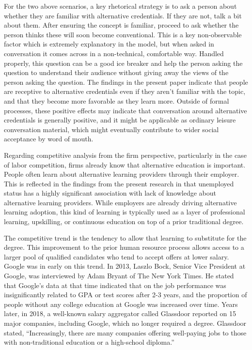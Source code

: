 \documentclass[AER]{/Users/zyl357/Documents/GitHub/research-dissertation-case-for-alt-ed/papers/alt-ed-survey/aea-latex-templates/AEA}
\begin{document}
For the two above scenarios, a key rhetorical strategy is to ask a person
about whether they are familiar with alternative credentials. If they are
not, talk a bit about them. After ensuring the concept is familiar,
proceed to ask whether the person thinks these will soon become
conventional. This is a key non-observable factor which is extremely
explanatory in the model, but when asked in conversation it comes across
in a non-technical, comfortable way. Handled properly, this question can
be a good ice breaker and help the person asking the question to
understand their audience without giving away the views of the person
asking the question. The findings in the present paper indicate that
people are receptive to alternative credentials even if they aren’t
familiar with the topic, and that they become more favorable as they learn
more. Outside of formal processes, these positive effects may indicate
that conversation around alternative credentials is generally positive,
and it might be applicable as ordinary leisure conversation material,
which might eventually contribute to wider social acceptance by word of
mouth.

Regarding competitive analysis from the firm perspective, particularly in
the case of labor competition, firms already know that alternative
education is important. People often learn about alternative learning
providers through their employer. This is reflected in the findings from
the present research in that unemployed status has a highly significant
association with lack of knowledge about alternative learning providers.
While employers are already driving alternative learning adoption, this
kind of learning is typically used as a layer of professional learning,
upskilling, or continuous education on top of a prior traditional degree.

The competitive trend is the tendency to allow that learning to substitute
for the degree. This improvement to the prior human resource process
allows access to a larger pool of qualified candidates who tend to accept
offers at lower salary. Google was in early on this trend. In 2013, Laszlo
Bock, Senior Vice President at Google, was interviewed by Adam Bryant of
The New York Times. He stated that Google’s data at that time indicated
that on the job performance was insignificantly related to GPA or test
scores after 2-3 years, and the proportion of people without any college
education at Google was increased over time. Years later, in 2018, a
well-known salary aggregator called Glassdoor reported on 15 major
companies, including Google, which no longer required a degree. Glassdoor
stated, “Increasingly, there are many companies offering well-paying jobs
to those with non-traditional education or a high-school diploma.”
\end{document}

